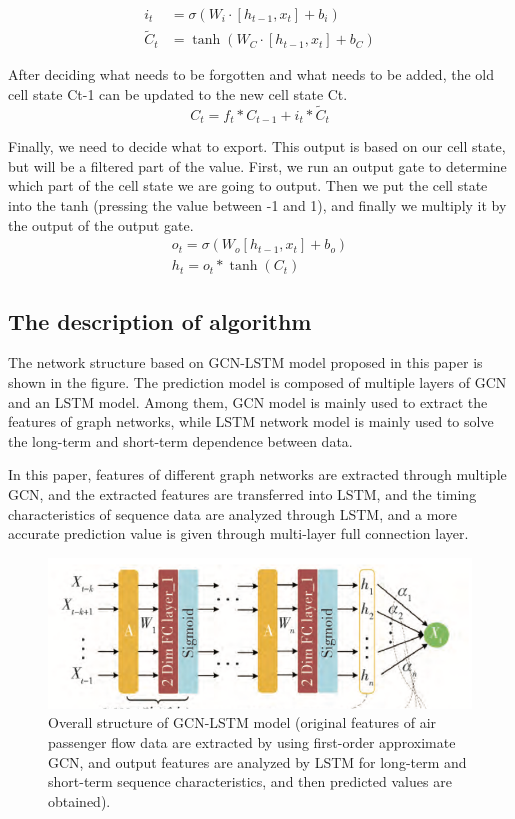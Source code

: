 \documentclass[journal,article,submit,moreauthors,pdftex]{Definitions/mdpi}
\begin{document}
\begin{equation}
    \begin{aligned}
    i_{t} &=\sigma\left(W_{i} \cdot\left[h_{t-1}, x_{t}\right]+b_{i}\right) \\
    \tilde{C}_{t} &=\tanh \left(W_{C} \cdot\left[h_{t-1}, x_{t}\right]+b_{C}\right)
    \end{aligned}
\end{equation}
\par After deciding what needs to be forgotten and what needs to be added, the old cell state Ct-1 can be updated to the new cell state Ct.
\begin{equation}
    C_{t}=f_{t} * C_{t-1}+i_{t} * \tilde{C}_{t}
\end{equation}
\par Finally, we need to decide what to export. This output is based on our cell state, but will be a filtered part of the value. First, we run an output gate to determine which part of the cell state we are going to output. Then we put the cell state into the tanh (pressing the value between -1 and 1), and finally we multiply it by the output of the output gate.
\begin{equation}
    \begin{array}{l}
    o_{t}=\sigma\left(W_{o}\left[h_{t-1}, x_{t}\right]+b_{o}\right) \\
    h_{t}=o_{t} * \tanh \left(C_{t}\right)
    \end{array}
\end{equation}
\subsection{The description of algorithm}
The network structure based on GCN-LSTM model proposed in this paper is shown in the figure. The prediction model is composed of multiple layers of GCN and an LSTM model. Among them, GCN model is mainly used to extract the features of graph networks, while LSTM network model is mainly used to solve the long-term and short-term dependence between data. 
\par In this paper, features of different graph networks are extracted through multiple GCN, and the extracted features are transferred into LSTM, and the timing characteristics of sequence data are analyzed through LSTM, and a more accurate prediction value is given through multi-layer full connection layer.
\begin{figure}[htp]
    \centering
    \includegraphics[width=8 cm]{./imgs/GCN-LSTM.png}
    \caption{Overall structure of GCN-LSTM model (original features of air passenger flow data are extracted by using first-order approximate GCN, and output features are analyzed by LSTM for long-term and short-term sequence characteristics, and then predicted values are obtained).}
\end{figure}
\end{document}
